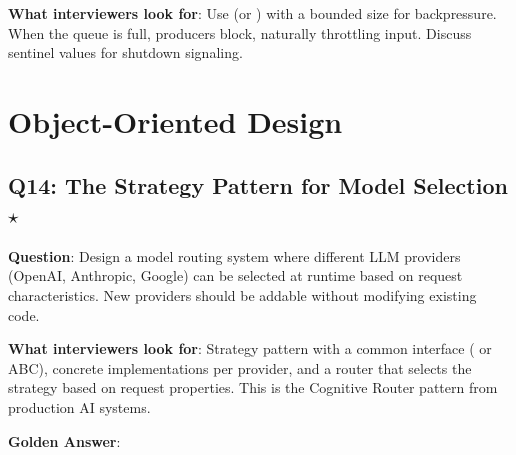 \textbf{What interviewers look for}: Use  (or ) with a bounded size for backpressure. When the queue is full, producers block, naturally throttling input. Discuss sentinel values for shutdown signaling.


\section{Object-Oriented Design}

\subsection{Q14: The Strategy Pattern for Model Selection $\star$}

\textbf{Question}: Design a model routing system where different LLM providers (OpenAI, Anthropic, Google) can be selected at runtime based on request characteristics. New providers should be addable without modifying existing code.

\textbf{What interviewers look for}: Strategy pattern with a common interface ( or ABC), concrete implementations per provider, and a router that selects the strategy based on request properties. This is the Cognitive Router pattern from production AI systems.

\textbf{Golden Answer}:

